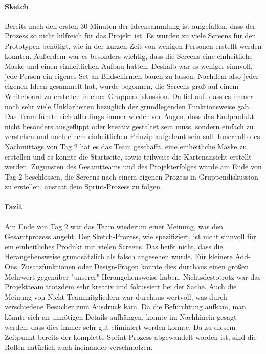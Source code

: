 \paragraph{Sketch}
Bereits nach den ersten 30 Minuten der Ideensammlung ist aufgefallen, dass der Prozess so nicht hilfreich für das Projekt ist. Es wurden zu viele Screens für den Prototypen benötigt, wie in der kurzen Zeit von wenigen Personen erstellt werden konnten. Außerdem war es besonders wichtig, dass die Screens eine einheitliche Maske und einen einheitlichen Aufbau hatten. Deshalb war es weniger sinnvoll, jede Person ein eigenes Set an Bildschirmen bauen zu lassen. Nachdem also jeder eigenen Ideen gesammelt hat, wurde begonnen, die Screens groß auf einem Whiteboard zu erstellen in einer Gruppendiskussion. Da fiel auf, dass es immer noch sehr viele Unklarheiten bezüglich der grundlegenden Funktionsweise gab. Das Team führte sich allerdings immer wieder vor Augen, dass das Endprodukt nicht besonders ausgeflippt oder kreativ gestaltet sein muss, sondern einfach zu verstehen und nach einem einheitlichen Prinzip aufgebaut sein soll. Innerhalb des Nachmittags von Tag 2 hat es das Team geschafft, eine einheitliche Maske zu erstellen und es konnte die Startseite, sowie teilweise die Kartenansicht erstellt werden.
Zugunsten des Gesamtteams und des Projekterfolges wurde am Ende von Tag 2 beschlossen, die Screens nach einem eigenen Prozess in Gruppendiskussion zu erstellen, anstatt dem Sprint-Prozess zu folgen.

\paragraph{Fazit}
Am Ende von Tag 2 war das Team wiederum einer Meinung, was den Gesamtprozess angeht. Der Sketch-Prozess, wie spezifiziert, ist nicht sinnvoll für ein einheitliches Produkt mit vielen Screens. Das heißt nicht, dass die Herangehensweise grundsätzlich als falsch angesehen wurde. Für kleinere Add-Ons, Zusatzfunktionen oder Design-Fragen könnte dies durchaus einen großen Mehrwert gegenüber "unserer" Herangehensweise haben. Nichtsdestotrotz war das Projektteam trotzdem sehr kreativ und fokussiert bei der Sache. Auch die Meinung von Nicht-Teammitgliedern war durchaus wertvoll, was durch verschiedene Besucher zum Ausdruck kam. Da die Befürchtung aufkam, man könnte sich an unnötigen Details aufhängen, konnte im Nachhinein gesagt werden, dass dies immer sehr gut eliminiert werden konnte. Da zu diesem Zeitpunkt bereits der komplette Sprint-Prozess abgewandelt worden ist, sind die Rollen natürlich auch ineinander verschmolzen.

